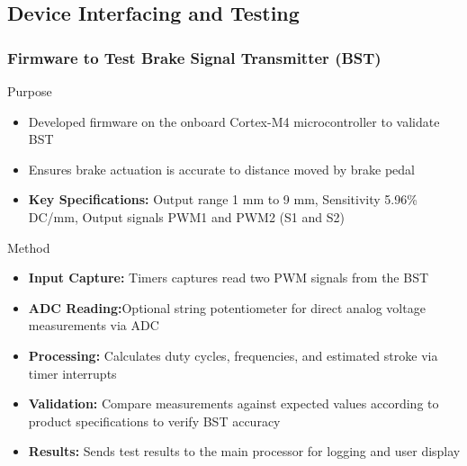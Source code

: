 \documentclass[8pt,compress]{beamer}
\newcommand\LightBold[1]{\textcolor{VSBlueLight}{\textbf{#1}}}
\begin{document}
\subsection{Device Interfacing and Testing}
\begin{frame}
  \frametitle{Firmware to Test Brake Signal Transmitter (BST)}
  \begin{block}{Purpose}
    \small{
      \begin{itemize}
        \item Developed firmware on the onboard Cortex-M4 microcontroller to validate BST
        \item Ensures brake actuation is accurate to distance moved by brake pedal
        \item \LightBold{Key Specifications:} Output range 1 mm to 9 mm, Sensitivity 5.96\% DC/mm, Output signals PWM1 and PWM2 (S1 and S2)
      \end{itemize}
    }
  \end{block}
  \hspace{-0.5cm}
  \begin{minipage}{0.485\textwidth}
    \begin{block}{Method}
      \small{
        \begin{itemize}
          \item \LightBold{Input Capture:} Timers captures read two PWM signals from the BST
          \item \LightBold{ADC Reading:}Optional string potentiometer for direct analog voltage measurements via ADC 
          \item \LightBold{Processing:} Calculates duty cycles, frequencies, and estimated stroke via timer interrupts
          \item \LightBold{Validation:} Compare measurements against expected values according to product specifications to verify BST accuracy
          \item \LightBold{Results:} Sends test results to the main processor for logging and user display
        \end{itemize}
      }
    \end{block}
  \end{minipage}
  \hfill
  \begin{minipage}{0.50\textwidth}
    \begin{figure}
      \centering

\end{figure}
\end{minipage}
\end{frame}
\end{document}
